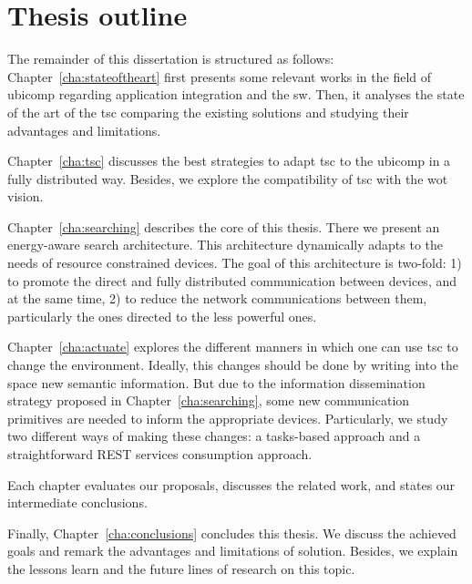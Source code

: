 \section{Thesis outline}
\label{sec:Outline}


The remainder of this dissertation is structured as follows:
Chapter~\ref{cha:stateoftheart} first presents some relevant works in the field of \acl{ubicomp} regarding application integration and the \ac{sw}. %
Then, it analyses the state of the art of the \acl{tsc} comparing the existing solutions and studying their advantages and limitations.

Chapter~\ref{cha:tsc} discusses the best strategies to adapt \ac{tsc} to the \ac{ubicomp} in a fully distributed way.
Besides, we explore the compatibility of \ac{tsc} with the \ac{wot} vision.

Chapter~\ref{cha:searching} describes the core of this thesis.
There we present an energy-aware search architecture.
This architecture dynamically adapts to the needs of resource constrained devices.
The goal of this architecture is two-fold:
1) to promote the direct and fully distributed communication between devices,
and at the same time,
2) to reduce the network communications between them, particularly the ones directed to the less powerful ones.

Chapter~\ref{cha:actuate} explores the different manners in which one can use \ac{tsc} to change the environment.
Ideally, this changes should be done by writing into the space new semantic information.
But due to the information dissemination strategy proposed in Chapter~\ref{cha:searching},
some new communication primitives are needed to inform the appropriate devices.
Particularly, we study two different ways of making these changes:
a tasks-based approach and a straightforward REST services consumption approach.


Each chapter evaluates our proposals, discusses the related work, and states our intermediate conclusions.

Finally, Chapter~\ref{cha:conclusions} concludes this thesis.
We discuss the achieved goals and remark the advantages and limitations of solution.
Besides, we explain the lessons learn and the future lines of research on this topic.